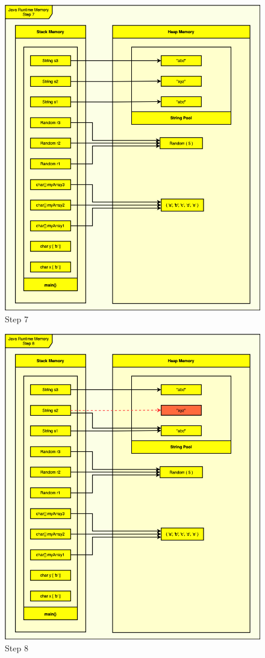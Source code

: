 \documentclass{assignment}
\begin{document}
\begin{figure}[p]
    \centering
    \includegraphics[scale=0.6]{assets/homework2Diagram(7).png}
    \caption{Step 7}
\end{figure}
\begin{figure}[p]
    \centering
    \includegraphics[scale=0.6]{assets/homework2Diagram(8).png}
    \caption{Step 8}
\end{figure}
\end{document}
